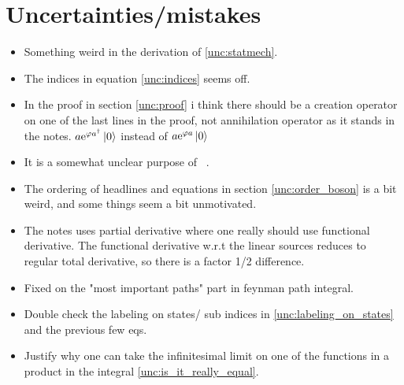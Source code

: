\section{Uncertainties/mistakes}

\begin{itemize}
\item Something weird in the derivation of \eqref{unc:statmech}.
\item The indices in equation \eqref{unc:indices} seems off.  
\item In the proof in section \ref{unc:proof} i think there should be a creation operator on one of the last lines in the proof, not annihilation operator as it stands in the notes. $a\mathrm{e}^{\varphi a^\dagger}\ket{0}$ instead of $a\mathrm{e}^{\varphi a}\ket{0}$
\item It is a somewhat unclear purpose of ~. 
\item The ordering of headlines and equations in section \ref{unc:order_boson} is a bit weird, and some things seem a bit unmotivated. 
\item The notes uses partial derivative where one really should use functional derivative. The functional derivative w.r.t the linear sources reduces to regular total derivative, so there is a factor 1/2 difference. 
\item Fixed on the "most important paths" part in feynman path integral. 
\item Double check the labeling on states/ sub indices in \eqref{unc:labeling_on_states} and the previous few eqs. 
\item Justify why one can take the infinitesimal limit on one of the functions in a product in the integral \ref{unc:is_it_really_equal}.

\end{itemize}